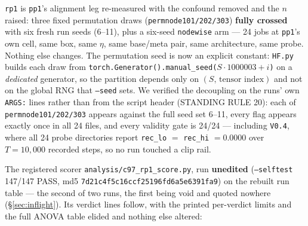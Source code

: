 \documentclass[10pt,letterpaper]{article}
\newcommand{\arm}[1]{\texttt{#1}}
\begin{document}
\arm{rp1} is \arm{pp1}'s alignment leg re-measured with the confound removed and the $n$ raised:
three fixed permutation draws (\arm{permnode101/202/303}) \textbf{fully crossed} with six fresh run
seeds (6--11), plus a six-seed \arm{nodewise} arm --- 24 jobs at \arm{pp1}'s own cell, same box,
same $\eta$, same base/meta pair, same architecture, same probe. Nothing else changes. The
permutation seed is now an explicit constant: \texttt{HF.py} builds each draw from
\texttt{torch.Generator().manual\_seed($S\cdot 1000003 + i$)} on a \emph{dedicated} generator, so
the partition depends only on $(S,\,\text{tensor index})$ and not on the global RNG that
\texttt{--seed} sets. We verified the decoupling on the runs' own \texttt{ARGS:} lines rather than
from the script header (STANDING RULE 20): each of \arm{permnode101/202/303} appears against the
full seed set 6--11, every flag appears exactly once in all 24 files, and every validity gate is
24/24 --- including \texttt{V0.4}, where all 24 probe directories report
\texttt{rec\_lo} $=$ \texttt{rec\_hi} $= 0.0000$ over $T = 10{,}000$ recorded steps, so no run
touched a clip rail.

The registered scorer \texttt{analysis/c97\_rp1\_score.py}, run \textbf{unedited}
(\texttt{--selftest} 147/147 PASS, md5 \texttt{7d21c4f5c16ccf25196fd6a5e6391fa9}) on the rebuilt
run table --- the second of two runs, the first being void and quoted nowhere
(\S\ref{sec:inflight}). Its verdict lines follow, with the printed per-verdict limits and the full
ANOVA table elided and nothing else altered:
\end{document}
